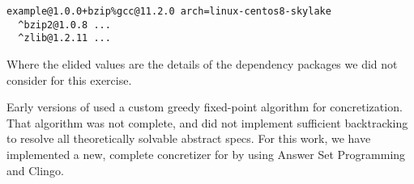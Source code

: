 \begin{verbatim}
example@1.0.0+bzip%gcc@11.2.0 arch=linux-centos8-skylake
  ^bzip2@1.0.8 ...
  ^zlib@1.2.11 ...
\end{verbatim}

Where the elided values are the details of the dependency packages we did not consider for this exercise.

Early versions of \spack used a custom greedy fixed-point algorithm for concretization.
That algorithm was not complete, and did not implement sufficient backtracking to resolve all theoretically solvable abstract specs.
For this work, we have implemented a new, complete concretizer for \spack by using Answer Set Programming and Clingo.
